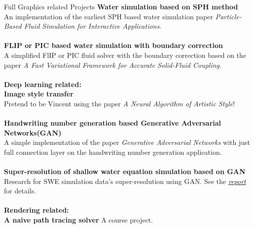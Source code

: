 \documentclass{resume} %
\begin{document}
\begin{rSection}{Full Graphics related Projects}
                {\bf Water simulation based on SPH method}\\An implementation of the earliest SPH based water simulation paper \emph{Particle-Based Fluid Simulation for Interactive Applications}.\\\\                
                {\bf FLIP or PIC based water simulation with boundary correction}\\A simplified FlIP or PIC fluid solver with the boundary correction based on the paper \emph{A Fast Variational Framework for Accurate Solid-Fluid Coupling}.\\\\
         \textbf{Deep learning related:}\\
                {\bf Image style transfer}\\Pretend to be Vincent using the paper \emph{A Neural Algorithm of Artistic Style}!\\\\
                {\bf Handwriting number generation based Generative Adversarial Networks(GAN)}\\ A simple implementation of the paper \emph{Generative Adversarial Networks} with just full connection layer on the handwriting number generation application.\\\\
                {\bf Super-resolution of shallow water equation simulation based on GAN}\\ Research for SWE simulation data's super-resolution using GAN. See the \emph{\href{https://wtyatzoo.github.io/reports/SWE.pdf}{report}} for details.   \\\\
        \textbf{Rendering related:}\\
                {\bf A naive path tracing solver} A course project.
                
         
\end{rSection}
\end{document}
